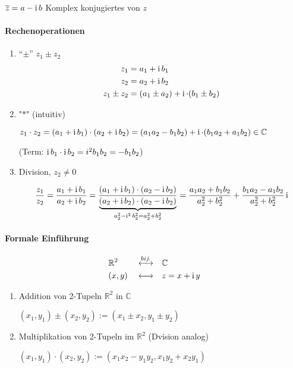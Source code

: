 \begin{definition}
 $\overline{z} = a - \operatorname{i} b$ Komplex konjugiertes von $z$
\end{definition}

\paragraph{Rechenoperationen}
\begin{enumerate}

\item ``$\pm$'' $z_1 \pm z_2$
\begin{align*}
z_1 & = a_1 + \operatorname{i} b_1 \\ 
z_2 & = a_2 + \operatorname{i} b_2 \\
z_1 \pm z_2 & = (a_1 \pm a_2) + \operatorname{i} \cdot (b_1 \pm b_2)
\end{align*}

\item "$\ast$" (intuitiv)

$z_1 \cdot z_2 = (a_1 + \operatorname{i} b_1) \cdot (a_2 + \operatorname{i} b_2) = (a_1 a_2 - b_1 b_2) + \operatorname{i} \cdot (b_1 a_2 + a_1 b_2) \in \mathbb{C}$

(Term: $\operatorname{i} b_1 \cdot \operatorname{i} b_2 = i^2 b_1 b_2 = - b_1 b_2$)

\item Division, $z_2 \neq 0$

$$ \frac{z_1}{z_2} = \frac{a_1 + \operatorname{i} b_1}{a_2 + \operatorname{i} b_2} = \frac{(a_1 + \operatorname{i} b_1) \cdot (a_2 - \operatorname{i} b_2)}{\underbrace{(a_2 + \operatorname{i} b_2) \cdot (a_2 - \operatorname{i} b_2)}_{a_2^2 - \operatorname{i}^2 b_2^2 = a_2^2 + b_2^2}} = \frac{a_1 a_2 + b_1 b_2}{a_2^2 + b_2^2} + \frac{b_1 a_2 - a_1 b_2}{a_2^2 + b_2^2} \operatorname{i} $$

\end{enumerate}

\paragraph{Formale Einführung}
\begin{alignat*}{3}
& \mathbb{R}^2 && \overset{bij.}{\longleftrightarrow} && \mathbb{C} \\
& (x, y) && \longleftrightarrow && z = x + \operatorname{i} y
\end{alignat*}
\begin{enumerate}
\item Addition von 2-Tupeln $\mathbb{R}^2$ in $\mathbb{C}$

$(x_1, y_1) \pm (x_2, y_2) := (x_1 \pm x_2, y_1 \pm y_2)$

\item Multiplikation von 2-Tupeln im $\mathbb{R}^2$ (Dvision analog)

$ (x_1, y_1) \cdot (x_2, y_2) := (x_1 x_2 - y_1 y_2, x_1 y_2 + x_2 y_1)$
\end{enumerate}

